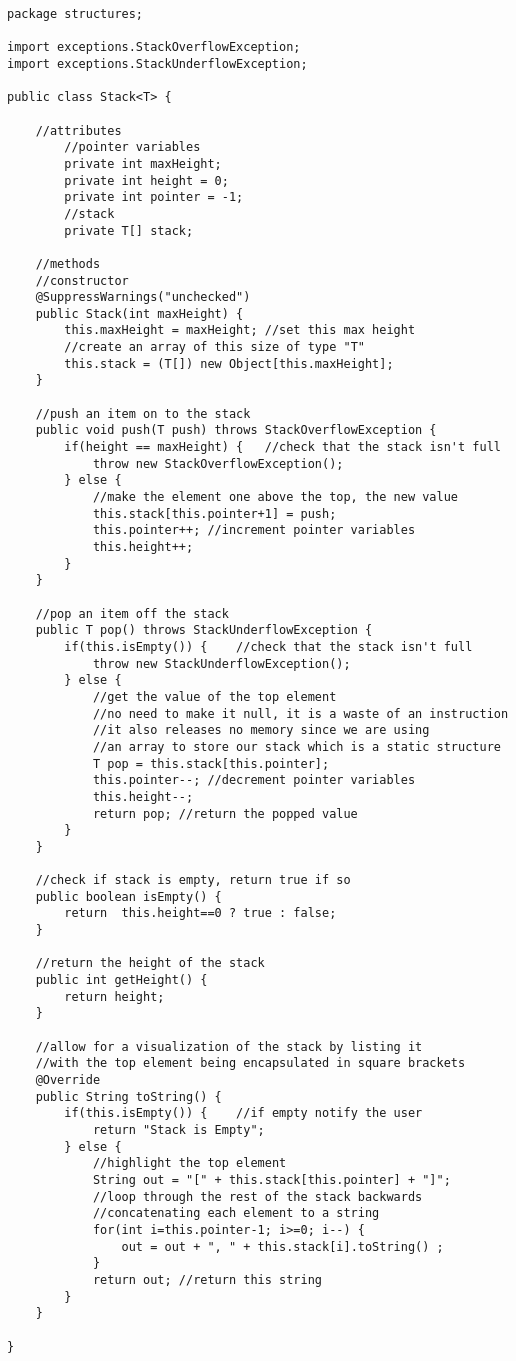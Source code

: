 \documentclass[../../../../../main.tex]{subfiles}
\begin{document}
\begin{verbatim}
package structures;

import exceptions.StackOverflowException;
import exceptions.StackUnderflowException;

public class Stack<T> {
	
	//attributes
		//pointer variables
		private int maxHeight;
		private int height = 0;
		private int pointer = -1;
		//stack
		private T[] stack;
	
	//methods
	//constructor
	@SuppressWarnings("unchecked")
	public Stack(int maxHeight) {
		this.maxHeight = maxHeight;	//set this max height
		//create an array of this size of type "T"
		this.stack = (T[]) new Object[this.maxHeight];		
	}
	
	//push an item on to the stack
	public void push(T push) throws StackOverflowException {
		if(height == maxHeight) {	//check that the stack isn't full
			throw new StackOverflowException();
		} else {
			//make the element one above the top, the new value
			this.stack[this.pointer+1] = push; 
			this.pointer++;	//increment pointer variables
			this.height++;
		}
	}
	
	//pop an item off the stack
	public T pop() throws StackUnderflowException {
		if(this.isEmpty()) {	//check that the stack isn't full
			throw new StackUnderflowException();
		} else {
			//get the value of the top element
			//no need to make it null, it is a waste of an instruction
			//it also releases no memory since we are using
			//an array to store our stack which is a static structure
			T pop = this.stack[this.pointer];
			this.pointer--; //decrement pointer variables
			this.height--;
			return pop;	//return the popped value
		}
	}
	
	//check if stack is empty, return true if so
	public boolean isEmpty() {
		return  this.height==0 ? true : false;
	}
	
	//return the height of the stack
	public int getHeight() {
		return height;
	}

	//allow for a visualization of the stack by listing it
	//with the top element being encapsulated in square brackets
	@Override
	public String toString() {
		if(this.isEmpty()) {	//if empty notify the user
			return "Stack is Empty";
		} else {
			//highlight the top element
			String out = "[" + this.stack[this.pointer] + "]";
			//loop through the rest of the stack backwards
			//concatenating each element to a string
			for(int i=this.pointer-1; i>=0; i--) {
				out = out + ", " + this.stack[i].toString() ;
			}
			return out;	//return this string
		}
	}
	
}
\end{verbatim}
\end{document}
